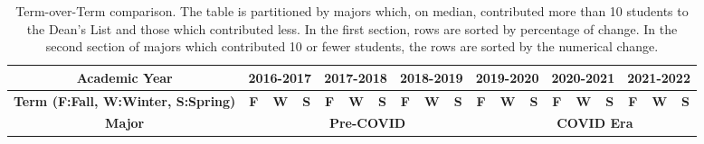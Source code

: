 \documentclass[10]{article}
\begin{document}
\begin{landscape}
\tiny
\begin{longtable}[c]{|ccccccccccccccccccc|}
	\caption{Term-over-Term comparison. The table is partitioned by majors which, on median, contributed more than 10 students to the Dean's List and those which contributed less.  In the first section, rows are sorted by percentage of change. In the second section of majors which contributed 10 or fewer students, the rows are sorted by the numerical change.}
	\label{tab:term-over-term-numbers}\\
	\hline
	\multicolumn{1}{|c|}{\textbf{Academic Year}}                     & \multicolumn{3}{c|}{\textbf{2016-2017}}                                                             & \multicolumn{3}{c|}{\textbf{2017-2018}}                                                             & \multicolumn{3}{c|}{\textbf{2018-2019}}                                                             & \multicolumn{3}{c|}{\textbf{2019-2020}}                                                             & \multicolumn{3}{c|}{\textbf{2020-2021}}                                                             & \multicolumn{3}{c|}{\textbf{2021-2022}}                                        \\ \hline
	\endhead
	\multicolumn{1}{|c|}{\textbf{Term (F:Fall, W:Winter, S:Spring)}} & \multicolumn{1}{c|}{\textbf{F}} & \multicolumn{1}{c|}{\textbf{W}} & \multicolumn{1}{c|}{\textbf{S}} & \multicolumn{1}{c|}{\textbf{F}} & \multicolumn{1}{c|}{\textbf{W}} & \multicolumn{1}{c|}{\textbf{S}} & \multicolumn{1}{c|}{\textbf{F}} & \multicolumn{1}{c|}{\textbf{W}} & \multicolumn{1}{c|}{\textbf{S}} & \multicolumn{1}{c|}{\textbf{F}} & \multicolumn{1}{c|}{\textbf{W}} & \multicolumn{1}{c|}{\textbf{S}} & \multicolumn{1}{c|}{\textbf{F}} & \multicolumn{1}{c|}{\textbf{W}} & \multicolumn{1}{c|}{\textbf{S}} & \multicolumn{1}{c|}{\textbf{F}} & \multicolumn{1}{c|}{\textbf{W}} & \textbf{S} \\ \hline
	\multicolumn{1}{|c|}{\textbf{Major}}                             & \multicolumn{10}{c|}{\textbf{Pre-COVID}}                                                                                                                                                                                                                                                                                                          & \multicolumn{8}{c|}{\textbf{COVID Era}}                                                                                                                                                                                                                  \\ \hline

\end{longtable}
\end{landscape}
\end{document}
